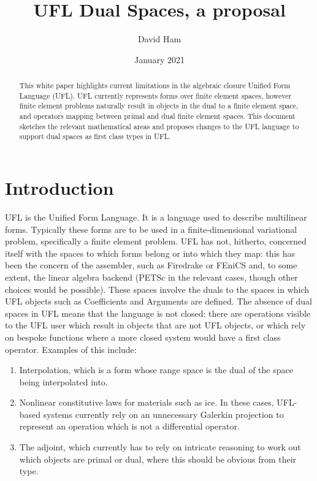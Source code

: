 \documentclass[a4paper,11pt]{article}
\title{UFL Dual Spaces, a proposal}
\author{David Ham}
\date{January 2021}
\begin{document}
\maketitle

\begin{abstract}
    This white paper highlights current limitations in the algebraic closure Unified Form Language (UFL). UFL currently represents forms over finite element spaces, however finite element problems naturally result in objects in the dual to a finite element space, and operators mapping between primal and dual finite element spaces. This document sketches the relevant mathematical areas and proposes changes to the UFL language to support dual spaces as first class types in UFL.
\end{abstract}

\section{Introduction}

UFL is the Unified Form Language. It is a language used to describe multilinear forms. Typically these forms are to be used in a finite-dimensional variational problem, specifically a finite element problem. UFL has not, hitherto, concerned itself with the spaces to which forms belong or into which they map: this has been the concern of the assembler, such as Firedrake or FEniCS and, to some extent, the linear algebra backend (PETSc in the relevant cases, though other choices would be possible). These spaces involve the duals to the spaces in which UFL objects such as Coefficients and Arguments are defined. The absence of dual spaces in UFL means that the language is not closed: there are operations visible to the UFL user which result in objects that are not UFL objects, or which rely on bespoke functions where a more closed system would have a first class operator. Examples of this include:

\begin{enumerate}
    \item Interpolation, which is a form whose range space is the dual of the space being interpolated into.
    \item Nonlinear constitutive laws for materials such as ice. In these cases, UFL-based systems currently rely on an unnecessary Galerkin projection to represent an operation which is not a differential operator.
    \item The adjoint, which currently has to rely on intricate reasoning to work out which objects are primal or dual, where this should be obvious from their type.
\end{enumerate}
\end{document}
